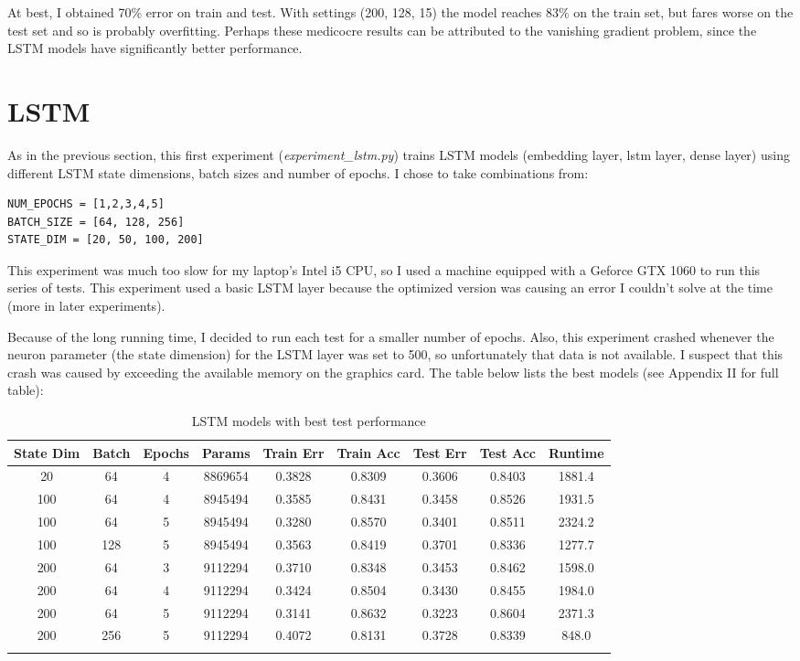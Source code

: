 \documentclass[letterpaper, 10pt]{article}
\begin{document}
At best, I obtained 70\% error on train and test. With settings (200, 128, 15)
the model reaches 83\% on the train set, but fares worse on the test set
and so is probably overfitting. Perhaps these medicocre results can be attributed
to  the vanishing gradient problem, since the LSTM models have significantly better
performance.

\section{LSTM}

As in the previous section, this first experiment ({\em experiment\_lstm.py}) trains
LSTM models (embedding layer, lstm layer, dense layer) using different
LSTM state dimensions, batch sizes and number of epochs. I chose to take
combinations from:

\begin{verbatim}
NUM_EPOCHS = [1,2,3,4,5]
BATCH_SIZE = [64, 128, 256]
STATE_DIM = [20, 50, 100, 200]
\end{verbatim}

This experiment was much too slow for my laptop's Intel i5 CPU, so I used a machine
equipped with a Geforce GTX 1060 to run this series of tests. This experiment used
a basic LSTM layer because the optimized version was causing an error I couldn't
solve at the time (more in later experiments).

Because of the long running time, I decided to run each test
for a smaller number of epochs. Also, this experiment crashed whenever
the neuron parameter (the state dimension) for the LSTM layer was set to 500, so
unfortunately that data is not available. I suspect that this crash was
caused by exceeding the available memory on the graphics card.
The table below lists the best models (see Appendix II for full table):

\newpage

\begin{longtable}{c | c | c | c | c | c | c | c | c}
State Dim & Batch & Epochs & Params & Train Err & Train Acc & Test Err & Test Acc & Runtime\\
\hline
\endhead
20 & 64 & 4 & 8869654 & 0.3828 & 0.8309 & 0.3606 & 0.8403 & 1881.4 \\
100 & 64 & 4 & 8945494 & 0.3585 & 0.8431 & 0.3458 & 0.8526 & 1931.5 \\
100 & 64 & 5 & 8945494 & 0.3280 & 0.8570 & 0.3401 & 0.8511 & 2324.2 \\
100 & 128 & 5 & 8945494 & 0.3563 & 0.8419 & 0.3701 & 0.8336 & 1277.7 \\
200 & 64 & 3 & 9112294 & 0.3710 & 0.8348 & 0.3453 & 0.8462 & 1598.0 \\
200 & 64 & 4 & 9112294 & 0.3424 & 0.8504 & 0.3430 & 0.8455 & 1984.0 \\
200 & 64 & 5 & 9112294 & 0.3141 & 0.8632 & 0.3223 & 0.8604 & 2371.3 \\
200 & 256 & 5 & 9112294 & 0.4072 & 0.8131 & 0.3728 & 0.8339 & 848.0 \\
\caption{LSTM models with best test performance}
\label{tab:resultslstm}
\end{longtable}
\end{document}
